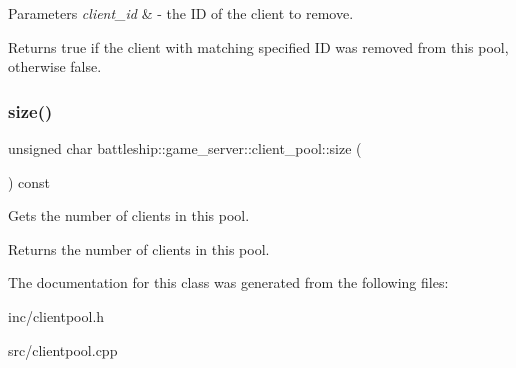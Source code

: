 \begin{DoxyParams}{Parameters}
{\em client\+\_\+id} & -\/ the ID of the client to remove. \\
\hline
\end{DoxyParams}
\begin{DoxyReturn}{Returns}
true if the client with matching specified ID was removed from this pool, otherwise false. 
\end{DoxyReturn}
\mbox{\label{classbattleship_1_1game__server_1_1client__pool_a4e90204ab16b5884148bbb41fe2c00df}} 
\subsubsection{\texorpdfstring{size()}{size()}}
{\footnotesize\ttfamily unsigned char battleship\+::game\+\_\+server\+::client\+\_\+pool\+::size (\begin{DoxyParamCaption}{ }\end{DoxyParamCaption}) const\hspace{0.3cm}{\ttfamily [inline]}}

Gets the number of clients in this pool. \begin{DoxyReturn}{Returns}
the number of clients in this pool. 
\end{DoxyReturn}


The documentation for this class was generated from the following files\+:\begin{DoxyCompactItemize}
\item 
inc/clientpool.\+h\item 
src/clientpool.\+cpp\end{DoxyCompactItemize}
